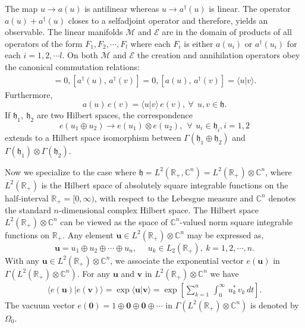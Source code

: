 The map $u\rightarrow a(u)$ is antilinear whereas  $u\rightarrow a^\dag({u})$ is linear.  The operator $a(u)+a^\dag(u)$ closes to a selfadjoint operator and therefore, yields an observable. The linear manifolds $\mathcal{M}$ and $\mathcal{E}$ are in the domain of products of all operators of the form $F_1, F_2, \cdots , F_l$ where each $F_i$ is either $a(u_i)$ or $a^\dag(u_i)$ for each $i=1,2,\cdots l$. On both 
$\mathcal{M}$ and $\mathcal{E}$ the creation and annihilation operators obey the canonical commutation relations: 
\begin{eqnarray}
 [a(u),\, a(v)]= 0,  [a^\dag(u),\, a^\dag(v)] = 0, [a(u),\, a^\dag(v)] = \langle u\vert v\rangle. \label{chap5-eq3.4}
\end{eqnarray} 
Furthermore, 
\begin{equation}
a(u)\, e(v)=\langle u\vert v\rangle\, e(v), \ \forall\ \ u, v\in \mathfrak{h}. \label{chap5-eq3.5}
\end{equation}
If $\mathfrak{h}_1,\ \mathfrak{h}_2$ are two Hilbert spaces,  the correspondence 
\begin{equation}
e(u_1\oplus u_2)\rightarrow e(u_1)\otimes e(u_2), \ \ \forall\ \, u_i\in\mathfrak{h}_i, i=1,2\label{chap5-eq3.6}
\end{equation} 
extends to a Hilbert space isomorphism between $\Gamma(\mathfrak{h}_1\oplus\mathfrak{h}_2)$ and $\Gamma(\mathfrak{h}_1)\otimes\Gamma(\mathfrak{h}_2)$. 

Now we specialize to the case where $\mathfrak{h}=L^2(\mathbb{R}_+,\mathbb{C}^n)=L^2(\mathbb{R}_+)\otimes \mathbb{C}^n$, where $L^2(\mathbb{R}_+)$ is the  Hilbert space of absolutely square integrable functions on the half-interval $\mathbb{R}_+=[0,\infty)$, with respect to the Lebesgue measure  and  $\mathbb{C}^n$  denotes the standard $n$-dimensional complex Hilbert space.  The Hilbert space $L^2(\mathbb{R}_+)\otimes \mathbb{C}^n$ can be viewed as the space of $\mathbb{C}^n$-valued norm square integrable functions on $\mathbb{R}_{+}$. 
Any element $\mathbf{u}\in L^2(\mathbb{R}_+) \otimes \mathbb{C}^n$ may be expressed as,  
$$
\mathbf{u}= u_1\oplus u_2\oplus \cdots \oplus u_n,\ \ \ \ \ \ u_k\in L_2(\mathbb{R}_+),\  k=1,2,\cdots, n.
$$
With any $\mathbf{u}\in L^2(\mathbb{R}_+)\otimes \mathbb{C}^n$, we associate the exponential vector $e(\mathbf{u})$ in 
$\Gamma(L^2(\mathbb{R}_+)\otimes \mathbb{C}^n)$. For any $\mathbf{u}$ and $\mathbf{v}$ in $L^2(\mathbb{R}_+)\otimes \mathbb{C}^n$ we have 
\begin{eqnarray}
\langle e(\mathbf{u})\vert e(\mathbf{v})\rangle={\exp}\langle \mathbf{u}\vert \mathbf{v}\rangle 
={\exp}\left[\sum_{k=1}^n\,\int_0^\infty\,  u_k^*\, v_k\, dt\right]. \label{chap5-eq3.7}
\end{eqnarray}
The vacuum vector $e(\mathbf{\mathbf{0}}) =   1 \oplus \mathbf{0} \oplus \mathbf{0} \oplus \cdots$ in  $\Gamma(L^2(\mathbb{R}_+)\otimes \mathbb{C}^n)$ is denoted by 
$\Omega_0$.  


